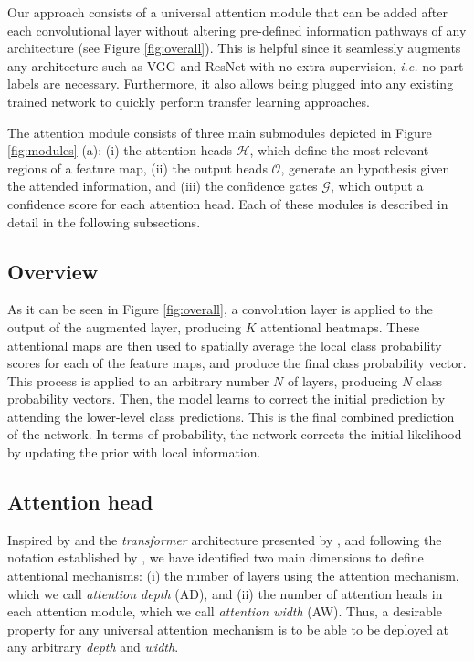 \documentclass[runningheads]{llncs}
\begin{document}
Our approach consists of a universal attention module that can be added after each convolutional layer without altering pre-defined information pathways of any architecture (see Figure \ref{fig:overall}). This is helpful since it seamlessly augments any architecture such as VGG and ResNet with no extra supervision, \emph{i.e.} no part labels are necessary. Furthermore, it also allows being plugged into any existing trained network to quickly perform transfer learning approaches.

The attention module consists of three main submodules depicted in Figure \ref{fig:modules} (a): (i) the attention heads $\mathcal{H}$, which define the most relevant regions of a feature map, (ii) the output heads $\mathcal{O}$, generate an hypothesis given the attended information, and (iii) the confidence gates $\mathcal{G}$, which output a confidence score for each attention head. Each of these modules is described in detail in the following subsections.

\subsection{Overview}
As it can be seen in Figure \ref{fig:overall}, a convolution layer is applied to the output of the augmented layer, producing $K$ attentional heatmaps. These attentional maps are then used to spatially average the local class probability scores for each of the feature maps, and produce the final class probability vector. This process is applied to an arbitrary number $N$ of layers, producing $N$ class probability vectors. Then, the model learns to correct the initial prediction by attending the lower-level class predictions. This is the final combined prediction of the network. In terms of probability, the network corrects the initial likelihood by updating the prior with local information.

\subsection{Attention head}
Inspired by \cite{zhao2017diversified} and the \emph{transformer} architecture presented by \cite{vaswani2017attention}, and following the notation established by \cite{Zagoruyko2016WRN}, we have identified two main dimensions to define attentional mechanisms: (i) the number of layers using the attention mechanism, which we call \emph{attention depth} (AD), and (ii) the number of attention heads in each attention module, which we call \emph{attention width} (AW). Thus, a desirable property for any universal attention mechanism is to be able to be deployed at any arbitrary \emph{depth} and \emph{width}. 
\end{document}
